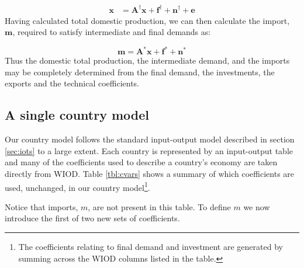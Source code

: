 \documentclass{article}
\begin{document}
\begin{align}
\boldsymbol{x}& = 
\boldsymbol{A^\dagger}\boldsymbol{x}
+ 
\boldsymbol{f^\dagger} + \boldsymbol{n^\dagger} + \boldsymbol{e} 
\label{eqn:xIRIO}
\end{align}
Having calculated total domestic production, we can then calculate the import, $\boldsymbol{m}$, required to satisfy intermediate and final demands as:

\begin{equation}\label{eqn:mIRIO}
\boldsymbol{m}
=
\boldsymbol{A^*}\boldsymbol{x}
+
\boldsymbol{f^*} + \boldsymbol{n^*} 
\end{equation}
Thus the domestic total production, the intermediate demand, and the imports may be completely determined from the final demand, the investments, the exports and the technical coefficients.

\subsection{A single country model}\label{sec:countries}
Our country model follows the standard input-output model described in section \ref{sec:iots} to a large extent.
Each country is represented by an input-output table and many of the coefficients used to describe a country's economy are taken directly from WIOD.
Table \ref{tbl:cvars} shows a summary of which coefficients are used, unchanged, in our country model\footnote{The coefficients relating to final demand and investment are generated by summing across the WIOD columns listed in the table.}.

Notice that imports, $m$, are not present in this table.
To define $m$ we now introduce the first of two new sets of coefficients. 
\end{document}
